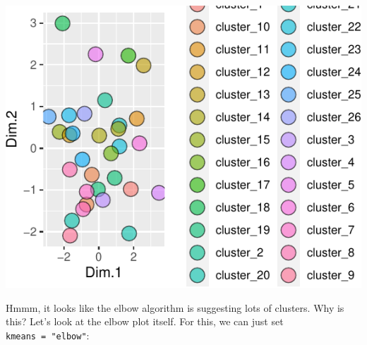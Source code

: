 \documentclass[
]{krantz}
\begin{document}
\begin{center}\includegraphics{index_files/figure-latex/unnamed-chunk-104-1} \end{center}

Hmmm, it looks like the elbow algorithm is suggesting lots of clusters. Why is this? Let's look at the elbow plot itself. For this, we can just set \texttt{kmeans\ =\ "elbow"}:
\end{document}
